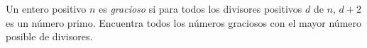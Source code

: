 Un entero positivo $n$ es \textit{gracioso} si para todos los divisores positivos $d$ de $n$, $d+2$ es un número primo. Encuentra todos los números graciosos con el mayor número posible de divisores.
